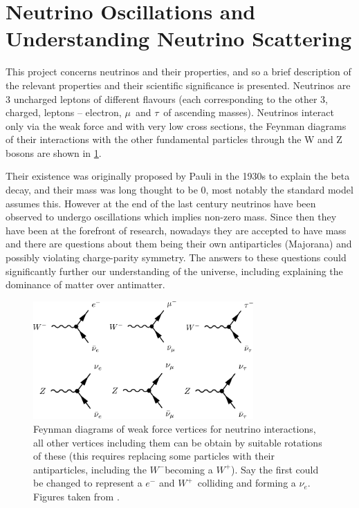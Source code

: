 \documentclass[a4paper,12pt]{article}
\newcommand{\Mu}{$\mu$}
\newcommand{\Tau}{$\tau$}
\newcommand{\Ne}{$\nu_e$}
\newcommand{\Wp}{$W^+$}
\newcommand{\Wm}{$W^-$}
\begin{document}
\pagestyle{plain}
\setcounter{page}{1}

\section{Neutrino Oscillations and Understanding Neutrino Scattering}
This project concerns neutrinos and their properties, and so a brief description of the relevant properties and their scientific significance is presented.
Neutrinos are 3 uncharged leptons of different flavours (each corresponding to the other 3, charged, leptons -- electron, \Mu\ and \Tau\ of ascending masses).
Neutrinos interact only via the weak force and with very low cross sections, the Feynman diagrams of their interactions with the other fundamental particles through the W and Z bosons are shown in \cref{fig:nu_feyn}.

Their existence was originally proposed by Pauli in the 1930s to explain the beta decay, and their mass was long thought to be 0, most notably the standard model assumes this.
However at the end of the last century neutrinos have been observed to undergo oscillations which implies non-zero mass.
Since then they have been at the forefront of research, nowadays they are accepted to have mass and there are questions about them being their own antiparticles (Majorana) and possibly violating charge-parity symmetry.
The answers to these questions could significantly further our understanding of the universe, including explaining the dominance of matter over antimatter.

\begin{figure}[H]
    \centering
    \includegraphics[width=0.75\textwidth]{figures/NeutrinoFeynman.pdf}
    \caption{
        Feynman diagrams of weak force vertices for neutrino interactions, all other vertices including them can be obtain by suitable rotations of these
        (this requires replacing some particles with their antiparticles, including the \Wm becoming a \Wp).
        Say the first could be changed to represent a $e^-$ and \Wp\ colliding and forming a \Ne.
        Figures taken from \cite{potterFeynmanDiagramsParticlea}.
    }\label{fig:nu_feyn}
\end{figure}
\end{document}
